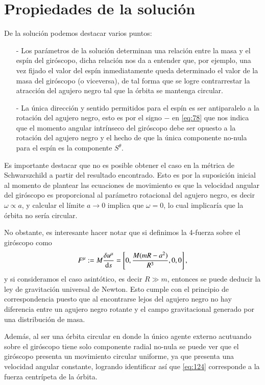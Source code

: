 \newpage
\section{Propiedades de la solución}

De la solución podemos destacar varios puntos:
\begin{itemize}
\item[-] Los parámetros de la solución determinan una relación entre la masa y el espín del giróscopo, dicha relación nos da a entender que, por ejemplo, una vez fijado el valor del espín inmediatamente queda determinado el valor de la masa del giróscopo (o viceversa), de tal forma que se logre contrarrestar la atracción del agujero negro tal que la órbita se mantenga circular.
\item[-] La única dirección y sentido permitidos para el espín es ser antiparalelo a la rotación del agujero negro, esto es por el signo $-$ en \eqref{eq:78} que nos indica que el momento angular intrínseco del giróscopo debe ser opuesto a la rotación del agujero negro y el hecho de que la única componente no-nula para el espín es la componente $S^{\theta}$.
\end{itemize}

Es importante destacar que no es posible obtener el caso en la métrica de Schwarszchild a partir del resultado encontrado. Esto es por la suposición inicial al momento de plantear las ecuaciones de movimiento es que la velocidad angular del giróscopo es proporcional al parámetro rotacional del agujero negro, es decir $\omega \propto a$, y calcular el límite $a \rightarrow 0$ implica que $\omega = 0$, lo cual implicaría que la órbita no sería circular.

No obstante, es interesante hacer notar que si definimos la 4-fuerza sobre el giróscopo como
\begin{equation}
\label{eq:124}
F^{\mu} := M \frac{\delta u^{\mu}}{\mathrm{d}s} = \left[ 0, \frac{M(mR-a^2)}{R^3},0,0 \right],
\end{equation}
y si consideramos el caso asintótico, es decir $R \gg m $, entonces se puede deducir la ley de gravitación universal de Newton. Esto cumple con el principio de correspondencia puesto que al encontrarse lejos del agujero negro no hay diferencia entre un agujero negro rotante y el campo gravitacional generado por una distribución de masa. 

Además, al ser una órbita circular en donde la único agente externo acutuando sobre el giróscopo tiene solo componente radial no-nula se puede ver que el giróscopo presenta un movimiento circular uniforme, ya que presenta una velocidad angular constante, logrando identificar así que \eqref{eq:124} corresponde a la fuerza centrípeta de la órbita.

